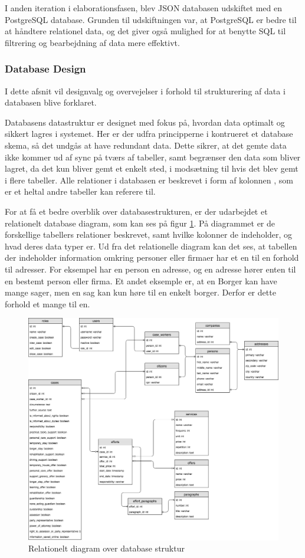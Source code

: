 \documentclass[../../main.tex]{subfiles}
\begin{document}
	I anden iteration i elaborationsfasen, blev JSON databasen udskiftet med en PostgreSQL database. Grunden til udskiftningen var, at PostgreSQL er bedre til at håndtere relationel data, og det giver også mulighed for at benytte SQL til filtrering og bearbejdning af data mere effektivt. 
    
\subsubsection{Database Design} \label{database-design}
I dette afsnit vil designvalg og overvejelser i forhold til strukturering af data i databasen blive forklaret.

   Databasens datastruktur er designet med fokus på, hvordan data optimalt og sikkert lagres i systemet. Her er der udfra principperne i  kontrueret et database skema, så det undgås at have redundant data. Dette sikrer, at det gemte data ikke kommer ud af sync på tværs af tabeller, samt begrænser den data som bliver lagret, da det kun bliver gemt et enkelt sted, i modsætning til hvis det blev gemt i flere tabeller.
   Alle relationer i databasen er beskrevet i form af kolonnen , som er et heltal andre tabeller kan referere til.
  
	For at få et bedre overblik over databasestrukturen, er der udarbejdet et relationelt database diagram, som kan ses på figur \ref{fig:er_diagram}. På diagrammet er de forskellige tabellers relationer beskrevet, samt hvilke kolonner de indeholder, og hvad deres data typer er. Ud fra det relationelle diagram kan det ses, at tabellen der indeholder information omkring personer eller firmaer har et en til en forhold til adresser. For eksempel har en person en adresse, og en adresse hører enten til en bestemt person eller firma. Et andet eksemple er, at en Borger kan have mange sager, men en sag kan kun høre til en enkelt borger. Derfor er dette forhold et mange til en. \\

\begin{figure}[H]
  \centering
  \includegraphics[scale=.30]{figurer/ER_Diagram.png}
  \caption{Relationelt diagram over database struktur}
  \label{fig:er_diagram}
\end{figure}
\end{document}
